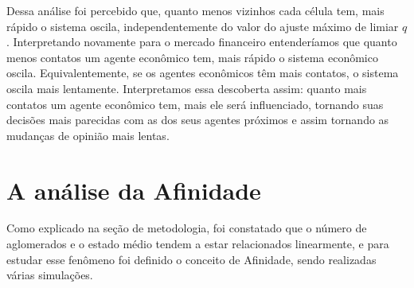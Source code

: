 \documentclass[
	12pt,				%
	openright,			%
	twoside,			%
	a4paper,			%
	english,			%
	french,				%
	spanish,			%
	brazil				%
	]{abntex2}
\begin{document}
Dessa análise foi percebido que, quanto menos vizinhos cada célula tem, mais rápido o sistema oscila, independentemente do valor do ajuste máximo de limiar $q$. Interpretando novamente para o mercado financeiro entenderíamos que quanto menos contatos um agente econômico tem, mais rápido o sistema econômico oscila. Equivalentemente, se os agentes econômicos têm mais contatos, o sistema oscila mais lentamente. Interpretamos essa descoberta assim: quanto mais contatos um agente econômico tem, mais ele será influenciado, tornando suas decisões mais parecidas com as dos seus agentes próximos e assim tornando as mudanças de opinião mais lentas.


\section{A análise da Afinidade}
Como explicado na seção de metodologia, foi constatado que o número de aglomerados e o estado médio tendem a estar relacionados linearmente, e para estudar esse fenômeno foi definido o conceito de Afinidade, sendo realizadas várias simulações.
\end{document}

